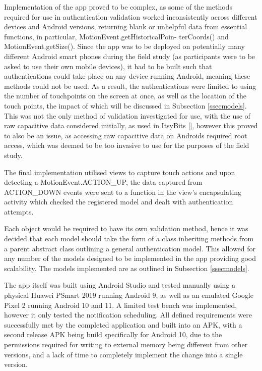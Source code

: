 \documentclass{l4proj}
\begin{document}
Implementation of the app proved to be complex, as some of the methods required for use in authentication validation worked inconsistently across different devices and Android versions, returning blank or unhelpful data from essential functions, in particular, MotionEvent.getHistoricalPoin-
terCoords() and MotionEvent.getSize(). Since the app was to be deployed on potentially many different Android smart phones during the field study (as participants were to be asked to use their own mobile devices), it had to be built such that authentications could take place on any device running Android, meaning these methods could not be used. As a result, the authentications were limited to using the number of touchpoints on the screen at once, as well as the location of the touch points, the impact of which will be discussed in Subsection \ref{ssecmodels}. This was not the only method of validation investigated for use, with the use of raw capacitive data considered initially, as used in ItsyBits [\cite{schmitz2021itsy}], however this proved to also be an issue, as accessing raw capacitive data on Androids required root access, which was deemed to be too invasive to use for the purposes of the field study.

The final implementation utilised views to capture touch actions and upon detecting a MotionEvent.ACTION\_UP, the data captured from ACTION\_DOWN events were sent to a function in the view's encapsulating activity which checked the registered model and dealt with authentication attempts.

Each object would be required to have its own validation method, hence it was decided that each model should take the form of a class inheriting methods from a parent abstract class outlining a general authentication model. This allowed for any number of the models designed to be implemented in the app providing good scalability. The models implemented are as outlined in Subsection \ref{ssecmodels}.

The app itself was built using Android Studio and tested manually using a physical Huawei PSmart 2019 running Android 9, as well as an emulated Google Pixel 2 running Android 10 and 11. A limited test bench was implemented, however it only tested the notification scheduling. All defined requirements were successfully met by the completed application and built into an APK, with a second release APK being build specifically for Android 10, due to the permissions required for writing to external memory being different from other versions, and a lack of time to completely implement the change into a single version.
\end{document}
